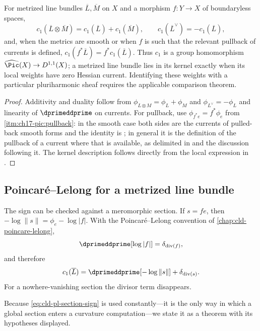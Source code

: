 \begin{corollary}
\label{cor:ch17-c1-functorial}
For metrized line bundles $\overline L,\overline M$ on $X$ and a
morphism $f:Y\to X$ of boundaryless spaces,
\[
 c_1(\overline L\otimes\overline M)
  =c_1(\overline L)+c_1(\overline M),
 \qquad
 c_1(\overline L^{\vee})=-c_1(\overline L),
\]
and, when the metrics are smooth or when $f$ is such that the relevant
pullback of currents is defined,
$c_1(f^*\overline L)=f^*c_1(\overline L)$.  Thus $c_1$ is a group
homomorphism $\widehat{\Pic}(X)\to D^{1,1}(X)$; a metrized line bundle lies
in its kernel exactly when its local weights have zero Hessian current.
Identifying these weights with a particular pluriharmonic sheaf requires
the applicable comparison theorem.
\end{corollary}

\begin{proof}
Additivity and duality follow from
$\phi_{L\otimes M}=\phi_L+\phi_M$ and $\phi_{L^\vee}=-\phi_L$ and
linearity of $\dprimeddprime$ on currents.  For pullback, use
$\phi_{f^*e}=f^*\phi_e$ from
\,\cref{itm:ch17-pic:pullback}: in the smooth
case both sides are the currents of pulled-back smooth forms and the
identity is ; in general it is the definition
of the pullback of a current where that is available, as delimited in
 and the discussion following it.  The kernel
description follows directly from the local expression in
.
\end{proof}

\subsection{Poincar\'e--Lelong for a metrized line bundle}
\label{sec:ch17-pl-bundle}

The sign can be checked against a meromorphic section.  If $s=fe$, then
$-\log\|s\|=\phi_e-\log|f|$.  With the Poincar\'e--Lelong convention of
\cref{chap:cld-poincare-lelong},
\[
             \dprimeddprime[\log|f|]=\delta_{\operatorname{div}(f)},
\]
and therefore
\begin{equation}
 c_1(\overline L)
   =\dprimeddprime[-\log\|s\|]+\delta_{\operatorname{div}(s)}.
\label{eq:cld-pl-section-sign}
\end{equation}
For a nowhere-vanishing section the divisor term disappears.

Because \eqref{eq:cld-pl-section-sign} is used constantly---it is the only
way in which a global section enters a curvature computation---we state it
as a theorem with its hypotheses displayed.

